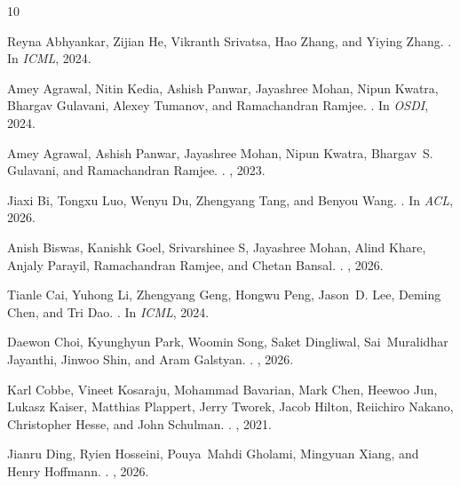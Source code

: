 \begin{thebibliography}{10}

Reyna Abhyankar, Zijian He, Vikranth Srivatsa, Hao Zhang, and Yiying Zhang.
.
\newblock In {\em ICML}, 2024.

Amey Agrawal, Nitin Kedia, Ashish Panwar, Jayashree Mohan, Nipun Kwatra,
  Bhargav Gulavani, Alexey Tumanov, and Ramachandran Ramjee.
.
\newblock In {\em OSDI}, 2024.

Amey Agrawal, Ashish Panwar, Jayashree Mohan, Nipun Kwatra, Bhargav~S.
  Gulavani, and Ramachandran Ramjee.
.
, 2023.

Jiaxi Bi, Tongxu Luo, Wenyu Du, Zhengyang Tang, and Benyou Wang.
.
\newblock In {\em ACL}, 2026.

Anish Biswas, Kanishk Goel, Srivarshinee S, Jayashree Mohan, Alind Khare,
  Anjaly Parayil, Ramachandran Ramjee, and Chetan Bansal.
.
, 2026.

Tianle Cai, Yuhong Li, Zhengyang Geng, Hongwu Peng, Jason~D. Lee, Deming Chen,
  and Tri Dao.
.
\newblock In {\em ICML}, 2024.

Daewon Choi, Kyunghyun Park, Woomin Song, Saket Dingliwal, Sai~Muralidhar
  Jayanthi, Jinwoo Shin, and Aram Galstyan.
.
, 2026.

Karl Cobbe, Vineet Kosaraju, Mohammad Bavarian, Mark Chen, Heewoo Jun, Lukasz
  Kaiser, Matthias Plappert, Jerry Tworek, Jacob Hilton, Reiichiro Nakano,
  Christopher Hesse, and John Schulman.
.
, 2021.

Jianru Ding, Ryien Hosseini, Pouya~Mahdi Gholami, Mingyuan Xiang, and Henry
  Hoffmann.
.
, 2026.


\end{thebibliography}
